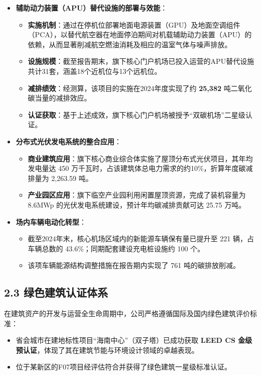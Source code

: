 \documentclass[a4paper,12pt]{article}
\begin{document}
\begin{itemize}
    \item \textbf{辅助动力装置（APU）替代设施的部署与效能}：
    \begin{itemize}
        \item \textbf{实施机制}：通过在停机位部署地面电源装置（GPU）及地面空调组件（PCA），以替代航空器在地面停泊期间对机载辅助动力装置（APU）的依赖，从而显著削减航空燃油消耗及相应的温室气体与噪声排放。
        \item \textbf{设施规模}：截至报告期末，旗下核心门户机场已投入运营的APU替代设施共计31套，涵盖18个近机位与13个远机位。
        \item \textbf{减排绩效}：经测算，该项目的实施在2024年度实现了约 \textbf{25,382} 吨二氧化碳当量的减排效应。
        \item \textbf{认证获取}：基于上述成效，旗下核心门户机场被授予“双碳机场”二星级认证。
    \end{itemize}
    
    \item \textbf{分布式光伏发电系统的整合应用}：
    \begin{itemize}
        \item \textbf{商业建筑应用}：旗下核心商业综合体实施了屋顶分布式光伏项目，其年均发电量达 450 万千瓦时，占该建筑体总电力需求的约10\%，折算年度碳减排量为 2,263.59 吨。
        \item \textbf{产业园区应用}：旗下临空产业园利用闲置屋顶资源，完成了装机容量为 8.6MWp 的光伏发电系统建设，预计年均碳减排贡献可达 25.75 万吨。
    \end{itemize}

    \item \textbf{场内车辆电动化转型}：
    \begin{itemize}
        \item 截至2024年末，核心机场区域内的新能源车辆保有量已提升至 221 辆，占车辆总数的 43.6\%；同期配套建设充电桩设施约 100 个。
        \item 该项车辆能源结构调整措施在报告期内实现了 761 吨的碳排放削减。
    \end{itemize}
\end{itemize}

\subsection{2.3 绿色建筑认证体系}

在建筑资产的开发与运营全生命周期中，公司严格遵循国际及国内绿色建筑评价标准：
\begin{itemize}
    \item 省会城市在建地标性项目“海南中心”（双子塔）已成功获取 \textbf{LEED CS 金级预认证}，体现了其在建筑节能与环境设计领域的卓越表现。
    \item 位于某新区的F07项目经评估符合并获得了绿色建筑一星级标准认证。
\end{itemize}
\end{document}
